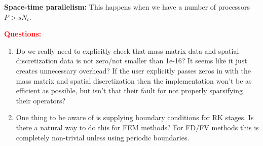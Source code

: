 \documentclass[a4paper,10pt]{article}
\begin{document}
\noindent \textbf{Space-time parallelism:} This happens when we have a number of processors $P > s N_t$.

\noindent \textbf{\textcolor{red}{Questions:}}
\begin{enumerate}
\item Do we really need to explicitly check that mass matrix data and spatial discretization data is not zero/not smaller than 1e-16? It seems like it just creates unnecessary overhead? If the user explicitly passes zeros in with the mass matrix and spatial discretization then the implementation won't be as efficient as possible, but isn't that their fault for not properly sparsifying their operators?
\item One thing to be aware of is supplying boundary conditions for RK stages. Is there a natural way to do this for FEM methods? For FD/FV methods this is completely non-trivial unless using periodic boundaries. 
\end{enumerate}
\end{document}
